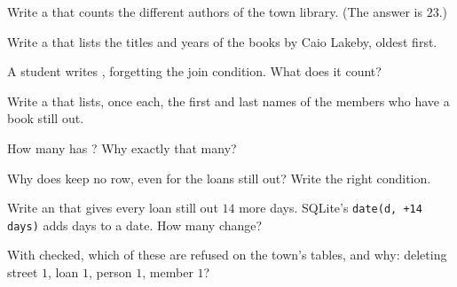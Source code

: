 \begin{exercise}[$\star$]\label{exo:g12:relational-databases-sql:3}
Write a  that counts the different authors of the town library. (The answer is $23$.)
\end{exercise}

\begin{exercise}[$\star$]\label{exo:g12:relational-databases-sql:4}
Write a  that lists the titles and years of the books by Caio Lakeby, oldest first.
\end{exercise}

\begin{exercise}[$\star$]\label{exo:g12:relational-databases-sql:5}
A student writes , forgetting the join condition. What does it count?
\end{exercise}

\begin{exercise}[$\star\star$]\label{exo:g12:relational-databases-sql:6}
Write a  that lists, once each, the first and last names of the members who have a book still out.
\end{exercise}

\begin{exercise}[$\star\star$]\label{exo:g12:relational-databases-sql:7}
How many  has ? Why exactly that many?
\end{exercise}

\begin{exercise}[$\star\star$]\label{exo:g12:relational-databases-sql:8}
Why does  keep no row, even for the loans still out? Write the right condition.
\end{exercise}

\begin{exercise}[$\star\star$]\label{exo:g12:relational-databases-sql:9}
Write an  that gives every loan still out $14$ more days. SQLite's \texttt{date(d, \textquotesingle{}+14 days\textquotesingle{})} adds days to
a date. How many  change?
\end{exercise}

\begin{exercise}[$\star\star$]\label{exo:g12:relational-databases-sql:10}
With  checked, which of these are refused on the town's tables, and why: deleting street $1$, loan $1$,
person $1$, member $1$?
\end{exercise}

